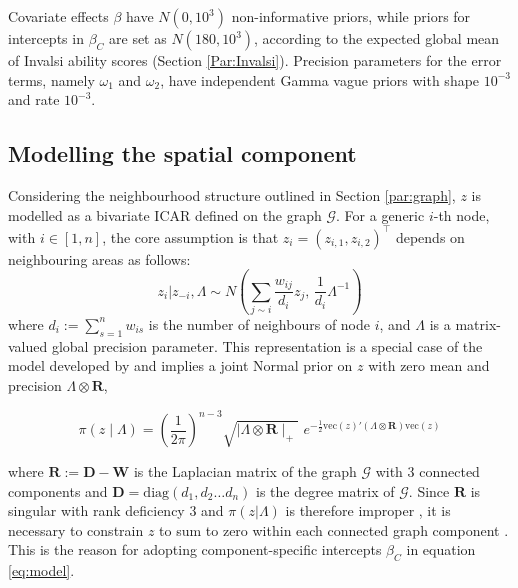\documentclass{book}
\begin{document}
Covariate effects $\beta$ have $N(0, 10^3)$ non-informative priors, while priors for intercepts in $\beta_C$ are set as $N(180, 10^3)$, according to the expected global mean of Invalsi ability scores (Section \ref{Par:Invalsi}).
Precision parameters for the error terms, namely $\omega_{1}$ and $\omega_2$, have independent Gamma vague priors with shape $10^{-3}$ and rate $10^{-3}$.

\subsection{Modelling the spatial component} \label{par:ICAR}
Considering the neighbourhood structure outlined in Section \ref{par:graph}, $z$ is modelled as a bivariate ICAR defined on the graph $\mathcal{G}$. For a generic $i$-th node, with $i \in [1, n]$, the core assumption is that $z_i = (z_{i,1}, z_{i,2})^\top$ depends on neighbouring areas as follows:
\begin{equation}
z_{i} | z_{-i}, \Lambda \sim N \left(\sum_{j \sim i} \frac{w_{ij}}{d_i} z_{j}, \, \frac{1}{d_i} \Lambda^{-1}\right)
\label{eq:ICAR_local}
\end{equation}
where  $d_i := \sum_{s=1}^n w_{is}$ is the number of neighbours of node $i$, and $\Lambda$ is a matrix-valued global precision parameter. This representation is a special case of the model developed by \citep[][theorem 2.1, corollary 2]{Mardia} and implies a joint Normal prior on $z$ with zero mean and precision $\Lambda \otimes \mathbf{R}$,

\begin{equation}
\pi\left(z\mid \Lambda \right) =
\left( \frac{1}{2 \pi} \right)^{n-3}\sqrt{\mid \Lambda \otimes\mathbf{R}  \mid_{+}} \, \, 
 e^{\displaystyle{-\tfrac{1}{2}
\mathrm{vec}(z)'(\Lambda \otimes \mathbf{R} ) \mathrm{vec}(z)}}
\label{eq:ICAR}
\end{equation}

where $\mathbf{R} := \mathbf{D} - \mathbf{W}$ is the Laplacian matrix of the graph $\mathcal{G}$ with $3$ connected components and $\mathbf{D} = \mathrm{diag}(d_1, d_2 \ldots d_n)$ is the degree matrix of $\mathcal{G}$.
Since $\mathbf{R}$ is singular with rank deficiency $3$ and $\pi(z|\Lambda)$ is therefore improper \citep{Hodges2003}, it is necessary to constrain $z$ to sum to zero within each connected graph component \citep{ICAR}. 
This is the reason for adopting component-specific intercepts $\beta_C$ in equation \ref{eq:model}.
\end{document}
